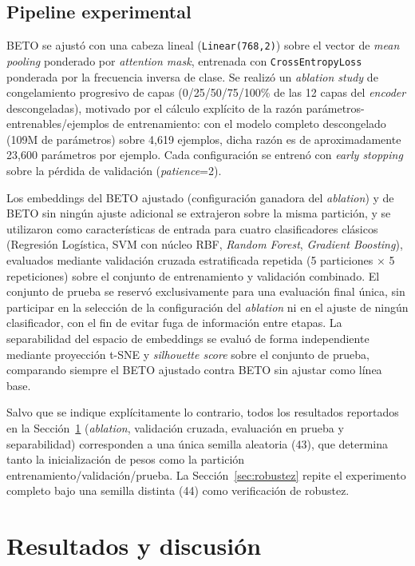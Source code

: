 \documentclass[conference]{IEEEtran}
\begin{document}
\subsection{Pipeline experimental}
BETO se ajustó con una cabeza lineal (\texttt{Linear(768,2)}) sobre el vector de \textit{mean pooling} ponderado por \textit{attention mask}, entrenada con \texttt{CrossEntropyLoss} ponderada por la frecuencia inversa de clase. Se realizó un \textit{ablation study} de congelamiento progresivo de capas (0/25/50/75/100\% de las 12 capas del \textit{encoder} descongeladas), motivado por el cálculo explícito de la razón parámetros-entrenables/ejemplos de entrenamiento: con el modelo completo descongelado (109M de parámetros) sobre 4{,}619 ejemplos, dicha razón es de aproximadamente 23{,}600 parámetros por ejemplo. Cada configuración se entrenó con \textit{early stopping} sobre la pérdida de validación (\textit{patience}=2).

Los embeddings del BETO ajustado (configuración ganadora del \textit{ablation}) y de BETO sin ningún ajuste adicional se extrajeron sobre la misma partición, y se utilizaron como características de entrada para cuatro clasificadores clásicos (Regresión Logística, SVM con núcleo RBF, \textit{Random Forest}, \textit{Gradient Boosting}), evaluados mediante validación cruzada estratificada repetida (5 particiones $\times$ 5 repeticiones) sobre el conjunto de entrenamiento y validación combinado. El conjunto de prueba se reservó exclusivamente para una evaluación final única, sin participar en la selección de la configuración del \textit{ablation} ni en el ajuste de ningún clasificador, con el fin de evitar fuga de información entre etapas. La separabilidad del espacio de embeddings se evaluó de forma independiente mediante proyección t-SNE y \textit{silhouette score} sobre el conjunto de prueba, comparando siempre el BETO ajustado contra BETO sin ajustar como línea base.

Salvo que se indique explícitamente lo contrario, todos los resultados reportados en la Sección~\ref{sec:resultados} (\textit{ablation}, validación cruzada, evaluación en prueba y separabilidad) corresponden a una única semilla aleatoria (43), que determina tanto la inicialización de pesos como la partición entrenamiento/validación/prueba. La Sección~\ref{sec:robustez} repite el experimento completo bajo una semilla distinta (44) como verificación de robustez.

\section{Resultados y discusión}
\label{sec:resultados}
\end{document}
